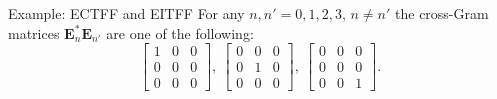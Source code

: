 \documentclass[12pt]{beamer}
\newcommand{\bfE}{\mathbf{E}}
\begin{document}
\begin{frame}{Example: ECTFF and EITFF}
{For any $n,n'=0,1,2,3$, $n\not=n'$ the cross-Gram matrices $\bfE_n^*\bfE_{n'}^{}$ are one of the following:
\begin{equation*}
    \left[\begin{array}{rrr}
    1 & 0 & 0\\
    0 & 0 & 0\\
    0 & 0 & 0
    \end{array}\right],\
    \left[\begin{array}{rrr}
    0 & 0 & 0\\
    0 & 1 & 0\\
    0 & 0 & 0
    \end{array}\right],\
    \left[\begin{array}{rrr}
    0 & 0 & 0\\
    0 & 0 & 0\\
    0 & 0 & 1
    \end{array}\right].
\end{equation*}
}
\end{frame}
\end{document}
